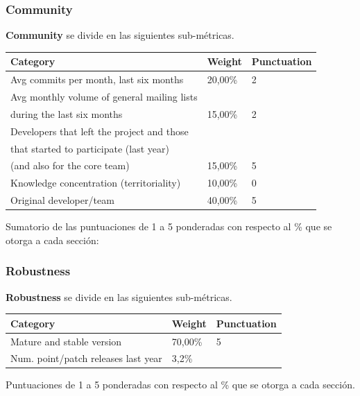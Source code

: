 \documentclass[xcolor=dvipsnames]{beamer}
\begin{document}
\begin{frame}[allowframebreaks]
\frametitle{Community}

\par \textbf{Community} se divide en las siguientes sub-m\'etricas.

\begin{tabular}{|l|l|l|}
    \hline {\bf Category} & {\bf Weight} & {\bf Punctuation}\\
    \hline Avg commits per month, last six months & 20,00\% & 2\\
    \hline Avg monthly volume of general mailing lists \\during the last six months & 15,00\% & 2\\
    \hline Developers that left the project and those\\ that started to participate (last year)\\ (and also for the  core team) & 15,00\% & 5\\
    \hline Knowledge concentration (territoriality) & 10,00\% & 0\\
    \hline Original developer/team & 40,00\% & 5\\
    \hline
\end{tabular}

Sumatorio de las puntuaciones de 1 a 5 ponderadas con respecto al \% que se otorga a cada secci\'on: 

\end{frame}

\begin{frame}[allowframebreaks]
\frametitle{Robustness}

\par \textbf{Robustness} se divide en las siguientes sub-m\'etricas.

\begin{tabular}{|l|l|l|}
    \hline {\bf Category} & {\bf Weight} & {\bf Punctuation}\\
    \hline Mature and stable version & 70,00\% & 5\\
    \hline Num. point/patch releases last year & 3,2\%\\
    \hline
\end{tabular}

Puntuaciones de 1 a 5 ponderadas con respecto al \% que se otorga a cada secci\'on.

\end{frame}
\end{document}
